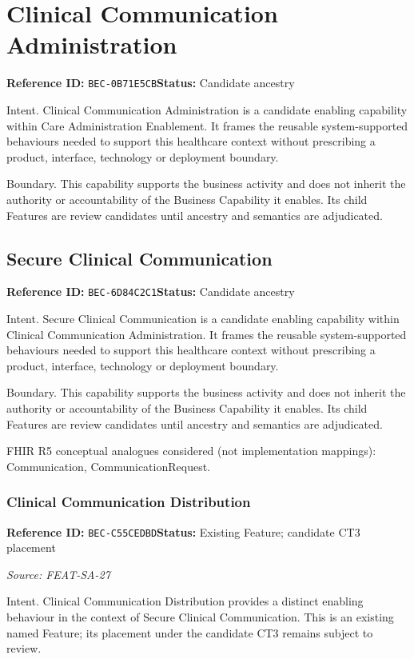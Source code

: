 \documentclass[11pt,a4paper,openany]{book}
\begin{document}
\section{Clinical Communication Administration}\label{cap:bec-0b71e5cb}
\noindent\textbf{Reference ID:} \texttt{BEC-0B71E5CB}\quad \textbf{Status:} Candidate ancestry\par
Intent. Clinical Communication Administration is a candidate enabling capability within Care Administration Enablement. It frames the reusable system-supported behaviours needed to support this healthcare context without prescribing a product, interface, technology or deployment boundary.

Boundary. This capability supports the business activity and does not inherit the authority or accountability of the Business Capability it enables. Its child Features are review candidates until ancestry and semantics are adjudicated.

\subsection{Secure Clinical Communication}\label{cap:bec-6d84c2c1}
\noindent\textbf{Reference ID:} \texttt{BEC-6D84C2C1}\quad \textbf{Status:} Candidate ancestry\par
Intent. Secure Clinical Communication is a candidate enabling capability within Clinical Communication Administration. It frames the reusable system-supported behaviours needed to support this healthcare context without prescribing a product, interface, technology or deployment boundary.

Boundary. This capability supports the business activity and does not inherit the authority or accountability of the Business Capability it enables. Its child Features are review candidates until ancestry and semantics are adjudicated.

FHIR R5 conceptual analogues considered (not implementation mappings): Communication, CommunicationRequest.

\subsubsection{Clinical Communication Distribution}\label{cap:bec-c55cedbd}
\noindent\textbf{Reference ID:} \texttt{BEC-C55CEDBD}\quad \textbf{Status:} Existing Feature; candidate CT3 placement\par
\noindent\textit{Source: FEAT-SA-27}\par
Intent. Clinical Communication Distribution provides a distinct enabling behaviour in the context of Secure Clinical Communication. This is an existing named Feature; its placement under the candidate CT3 remains subject to review.
\end{document}
